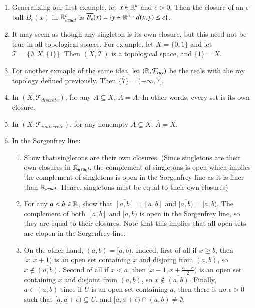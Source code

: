 \documentclass[12pt, a4paper, oneside, openright, titlepage]{book}
\begin{document}
\begin{eg}
\begin{enumerate}
\begin{proof}
\begin{enumerate}
                \end{enumerate}
            \end{proof}
        \item Generalizing our first example, let $x\in\mathbb R^n$ and $\epsilon > 0$. Then the closure of an $\epsilon$-ball $B_{\epsilon}(x)$ in $\mathbb R^n_{usual}$ is $\overline{B_{\epsilon}}(x) = \{y\in \mathbb R^n:d(x,y)\leq \epsilon\}$.
        \item It may seem as though any singleton is its own closure, but this need not be true in all topological spaces. For example, let $X = \{0,1\}$ and let $\mathcal{T} = \{\emptyset, X, \{1\}\}$. Then $(X,\mathcal{T})$ is a topological space, and $\overline{\{1\}} = X$. 
        \item For another exmaple of the same idea, let $(\mathbb R,\mathcal{T}_{ray})$ be the reals with the ray topology defined previously. Then $\overline{\{7\}} = (-\infty,7]$. 
        \item In $(X,\mathcal{T}_{discrete})$, for any $A \subseteq X$, $\overline{A} = A$. In other words, every set is its own closure.
        \item In $(X,\mathcal{T}_{indiscrete})$, for any nonempty $A \subseteq X$, $\overline{A} = X$.
        \item In the Sorgenfrey line:\begin{enumerate}
                \item Show that singletons are their own closures. (Since singletons are their own closures in $\mathbb R_{usual}$, the complement of singletons is open which implies the complement of singletons is open in the Sorgenfrey line as it is finer than $\mathbb R_{usual}$. Hence, singletons must be equal to their own closures)
                \item For any $a<b \in \mathbb R$, show that $\overline{[a,b]} = [a,b]$ and $\overline{[a,b)} = [a,b)$. The complement of both $[a,b]$ and $[a,b)$ is open in the Sorgenfrey line, so they are equal to their closures. Note that this implies that all open sets are clopen in the Sorgenfrey line.
                \item On the other hand, $\overline{(a,b)} = [a,b)$. Indeed, first of all if $x \geq b$, then $[x,x+1)$ is an open set containing $x$ and disjoing from $(a,b)$, so $x \notin \overline{(a,b)}$. Second of all if $x < a$, then $[x-1, x+\frac{a-x}{2})$ is an open set containing $x$ and disjoint from $(a,b)$, so $x \notin \overline{(a,b)}$. Finally, $a \in \overline{(a,b)}$ since if $U$ is an open set containing $a$, then there is no $\epsilon > 0$ such that $[a,a+\epsilon) \subseteq U$, and $[a,a+\epsilon)\cap(a,b) \neq \emptyset$.

\end{enumerate}
\end{enumerate}
\end{eg}
\end{document}
